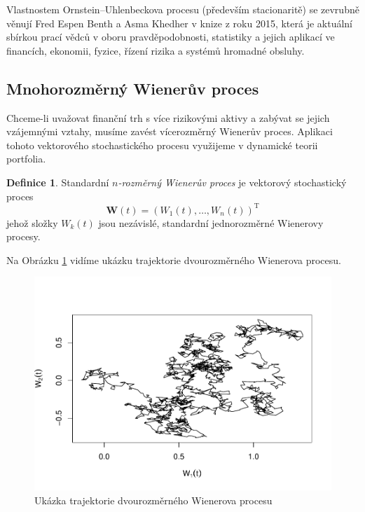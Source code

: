 \documentclass[a4paper,12pt]{report}
\theoremstyle{definition} \newtheorem{definice}[veta]{Definice}
\theoremstyle{remark}
\begin{document}
Vlastnostem Ornstein–Uhlenbeckova procesu (především stacionaritě) se zevrubně věnují Fred Espen Benth a Asma Khedher v knize \cite{podolskij2015fascination} z roku 2015, která je aktuální sbírkou prací vědců v oboru pravděpodobnosti, statistiky a jejich aplikací ve financích, ekonomii, fyzice, řízení rizika a systémů hromadné obsluhy.

\subsection{Mnohorozměrný Wienerův proces}
Chceme-li uvažovat finanční trh s více rizikovými aktivy a zabývat se jejich vzájemnými vztahy, musíme zavést vícerozměrný Wienerův proces.
Aplikaci tohoto vektorového stochastického procesu využijeme v dynamické teorii portfolia.

\begin{definice}
Standardní \textit{$n$-rozměrný Wienerův proces} je vektorový stochastický proces
$$\boldsymbol{W}(t) = (W_1(t), \dots, W_n(t))^\mathrm{T}$$
jehož složky $W_k(t)$ jsou nezávislé, standardní jednorozměrné Wienerovy procesy.
\end{definice}

Na Obrázku \ref{WP_2D_graf} vidíme ukázku trajektorie dvourozměrného Wienerova procesu.
\begin{figure}[!htbp]
  \centering 
	\includegraphics[width=13.5cm, clip, trim= 0 20 25 50]{IMG/WP_2D_v6.pdf}
  \caption{Ukázka trajektorie dvourozměrného Wienerova procesu}  \label{WP_2D_graf}
\end{figure}
\end{document}
